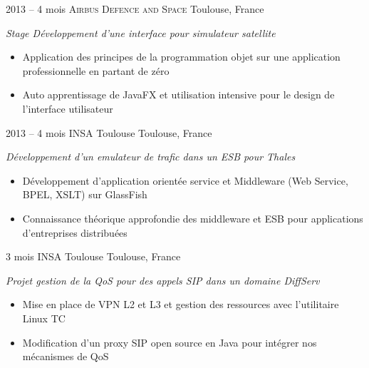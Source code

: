 \documentclass[]{friggeri-cv} %
\begin{document}
\begin{entrylist}
\entry
{2013 -- 4 mois}
{\textsc{Airbus Defence and Space}}
{Toulouse, France}
{\emph{Stage Développement d'une interface pour simulateur satellite}
\begin{itemize}
\item Application des principes de la programmation objet sur une application professionnelle en partant de zéro
\item Auto apprentissage de JavaFX et utilisation intensive pour le design de l'interface utilisateur
\end{itemize}
}
\entry
{2013 -- 4 mois}
{INSA Toulouse}
{Toulouse, France}
{\emph{Développement d'un emulateur de trafic dans un ESB pour Thales}
\begin{itemize}
\item Développement d'application orientée service et Middleware (Web Service, BPEL, XSLT) sur GlassFish
\item Connaissance théorique approfondie des middleware et ESB pour applications d'entreprises distribuées
\end{itemize}}
\entry
{3 mois}
{INSA Toulouse}
{Toulouse, France}
{\emph{Projet gestion de la QoS pour des appels SIP dans un domaine DiffServ}
\begin{itemize}
\item Mise en place de VPN L2 et L3 et gestion des ressources avec l'utilitaire Linux TC
\item Modification d'un proxy SIP open source en Java pour intégrer nos mécanismes de QoS
\end{itemize}}


\end{entrylist}
\end{document}
